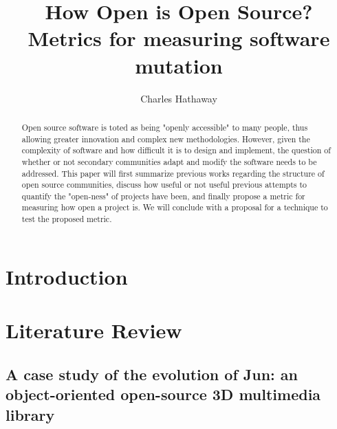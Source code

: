 \documentclass[]{article}
\title{How Open is Open Source? Metrics for measuring software mutation}
\author{Charles Hathaway}
\begin{document}
\maketitle

\begin{abstract}

Open source software is toted as being "openly accessible" to many people, thus allowing greater innovation and complex new methodologies.
However, given the complexity of software and how difficult it is to design and implement, the question of whether or not secondary communities adapt and modify the software needs to be addressed.
This paper will first summarize previous works regarding the structure of open source communities, discuss how useful or not useful previous attempts to quantify the "open-ness" of projects have been, and finally propose a metric for measuring how open a project is.
We will conclude with a proposal for a technique to test the proposed metric.

\end{abstract}

\section{Introduction}


\section{Literature Review}




\subsection{A case study of the evolution of Jun: an object-oriented open-source 3D multimedia library}
\end{document}
